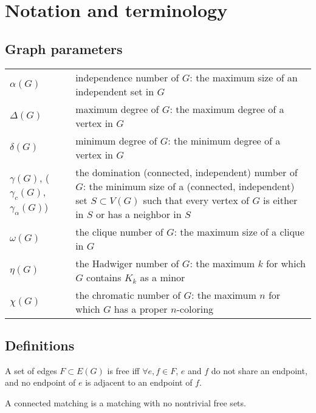 %
%

\section{Notation and terminology}
\subsection{Graph parameters}
	\vskip 0.5cm
\begin{tabular}{lp{4in}}
		$\alpha(G)$ & independence number of $G$: the maximum size of an independent set in $G$\\
		$\Delta(G)$ & maximum degree of $G$: the maximum degree of a vertex in $G$\\
		$\delta(G)$ & minimum degree of $G$: the minimum degree of a vertex in $G$\\
		$\gamma(G)$, ($\gamma_c(G)$, $\gamma_\alpha(G)$) & the domination (connected, independent) number of $G$: the minimum size of a (connected, independent) set $S\subset V(G)$ such that every vertex of $G$ is either in $S$ or has a neighbor in $S$\\
		$\omega(G)$ & the clique number of $G$: the maximum size of a clique in $G$\\
		$\eta(G)$ & the Hadwiger number of $G$: the maximum $k$ for which $G$ contains $K_k$ as a  minor\\
		$\chi(G)$ & the chromatic number of $G$: the maximum $n$ for which $G$ has a proper $n$-coloring\\
				
\end{tabular}

\subsection{Definitions}


\begin{mydef}
	A set of edges $F \subset E(G)$ is free iff $\forall e,f \in F$, $e$ and $f$ do not share an endpoint, and no endpoint of $e$ is adjacent to an endpoint of $f$.
\end{mydef}

\begin{mydef}
	A connected matching is a matching with no nontrivial free sets.
\end{mydef}





%
